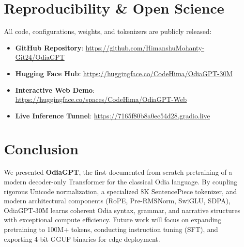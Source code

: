 \documentclass[10pt,twocolumn,letterpaper]{article}
\begin{document}
\section{Reproducibility \& Open Science}

All code, configurations, weights, and tokenizers are publicly released:
\begin{itemize}
    \item \textbf{GitHub Repository}: \url{https://github.com/HimanshuMohanty-Git24/OdiaGPT}
    \item \textbf{Hugging Face Hub}: \url{https://huggingface.co/CodeHima/OdiaGPT-30M}
    \item \textbf{Interactive Web Demo}: \url{https://huggingface.co/spaces/CodeHima/OdiaGPT-Web}
    \item \textbf{Live Inference Tunnel}: \url{https://7165f80b8a0ec54d28.gradio.live}
\end{itemize}

\section{Conclusion}

We presented \textbf{OdiaGPT}, the first documented from-scratch pretraining of a modern decoder-only Transformer for the classical Odia language. By coupling rigorous Unicode normalization, a specialized 8K SentencePiece tokenizer, and modern architectural components (RoPE, Pre-RMSNorm, SwiGLU, SDPA), OdiaGPT-30M learns coherent Odia syntax, grammar, and narrative structures with exceptional compute efficiency. Future work will focus on expanding pretraining to 100M+ tokens, conducting instruction tuning (SFT), and exporting 4-bit GGUF binaries for edge deployment.
\end{document}

